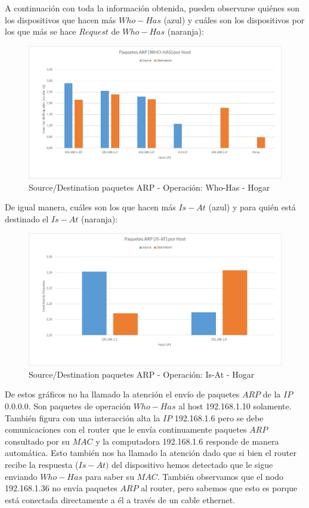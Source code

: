 A continuación con toda la información obtenida, pueden observarse quiénes son los dispositivos que hacen más $Who-Has$ (azul) y 
cuáles son los dispositivos por los que más se hace $Request$ de $Who-Has$ (naranja):
\newpage

\begin{figure}[h!]
\centering
\includegraphics[scale=0.5]{./img/arp_whoHas_casa.jpg}
\caption{Source/Destination paquetes ARP - Operación: Who-Has - Hogar}
\end{figure}

De igual manera, cuáles son los que hacen más $Is-At$ (azul) y para quién está destinado el $Is-At$ (naranja):

\begin{figure}[h!]
\centering
\includegraphics[scale=0.5]{./img/arp_isAt_casa.jpg}
\caption{Source/Destination paquetes ARP - Operación: Is-At - Hogar}
\end{figure}

De estos gráficos no ha llamado la atención el envío de paquetes $ARP$ de la $IP$ $0.0.0.0$. Son paquetes de operación $Who-Has$ al host
192.168.1.10 solamente. También figura con una interacción alta la $IP$ 192.168.1.6 pero se debe comunicaciones con el router que le envía
continuamente paquetes $ARP$ consultado por su $MAC$ y la computadora 192.168.1.6 responde de manera automática. Esto también nos ha llamado la 
atención dado que si bien el router recibe la respuesta ($Is-At)$ del dispositivo hemos detectado que le sigue enviando $Who-Has$ para saber su $MAC$.
También observamos que el nodo 192.168.1.36 no envía paquetes $ARP$ al router, pero sabemos que esto es porque está conectada directamente
a él a través de un cable ethernet.\\

